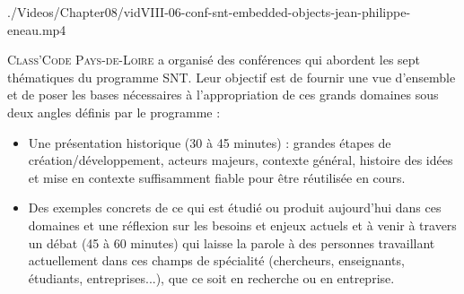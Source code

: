 \begin{marginvideo}
		{./Videos/Chapter08/vidVIII-06-conf-snt-embedded-objects-jean-philippe-eneau.mp4}%
\end{marginvideo}

\textsc{Class'Code} \textsc{Pays-de-Loire} a organisé des conférences qui abordent les sept thématiques du programme SNT. Leur objectif est de fournir une vue d’ensemble et de poser les bases nécessaires à l’appropriation de ces grands domaines sous deux angles définis par le programme :
\begin{itemize}
\item Une présentation historique (30 à 45 minutes) : grandes étapes de création/développement, acteurs majeurs, contexte général, histoire des idées et mise en contexte suffisamment fiable pour être réutilisée en cours.
\item Des exemples concrets de ce qui est étudié ou produit aujourd’hui dans ces domaines et une réflexion sur les besoins et enjeux actuels et à venir à travers un débat (45 à 60 minutes) qui laisse la parole à des personnes travaillant actuellement dans ces champs de spécialité  (chercheurs, enseignants, étudiants, entreprises...), que ce soit en recherche ou en entreprise.
\end{itemize}

